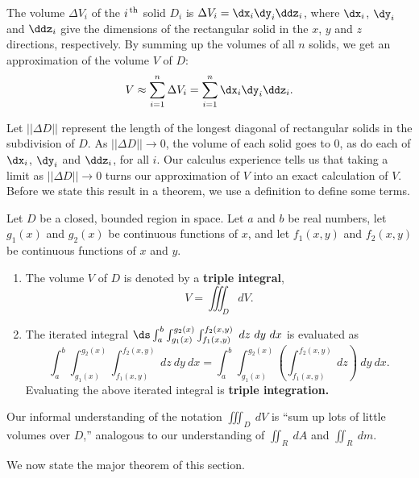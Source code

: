 The volume $\Delta V_i$ of the $i^\text{\,th}$ solid $D_i$ is $\Delta V_i = \dx_i\dy_i\ddz_i$, where $\dx_i$, $\dy_i$ and $\ddz_i$ give the dimensions of the rectangular solid in the $x$, $y$ and $z$ directions, respectively. By summing up the volumes of all $n$ solids, we get an approximation of the volume $V$ of $D$:
$$V \approx \sum_{i=1}^n \Delta V_i = \sum_{i=1}^n \dx_i\dy_i\ddz_i.$$

Let $||\Delta D||$ represent the length of the longest diagonal of rectangular solids in the subdivision of $D$. As $||\Delta D||\to 0$, the volume of each solid goes to 0, as do each of $\dx_i$, $\dy_i$ and $\ddz_i$, for all $i$. Our calculus experience tells us that taking a limit as $||\Delta D||\to 0$ turns our approximation of $V$ into an exact calculation of $V$. Before we state this result in a theorem, we use a definition to define some terms.
\clearpage

\setboxwidth{100pt}
\enlargethispage{3\baselineskip}
\noindent\hskip-100pt\begin{minipage}{\linewidth}
{Let $D$ be a closed, bounded region in space. Let $a$ and $b$ be real numbers, let $g_1(x)$ and $g_2(x)$ be continuous functions of $x$, and let $f_1(x,y)$ and $f_2(x,y)$ be continuous functions of $x$ and $y$.
\begin{enumerate}
	\item	The volume $V$ of $D$ is denoted by a \textbf{triple integral},
	$$V = \iiint_D dV.$$
	
	\item The iterated integral $\ds \int_a^b\int_{g_1(x)}^{g_2(x)}\int_{f_1(x,y)}^{f_2(x,y)} \ dz\ dy\ dx$ is evaluated as 
	$$\int_a^b\int_{g_1(x)}^{g_2(x)}\int_{f_1(x,y)}^{f_2(x,y)} \ dz\ dy\ dx=\int_a^b\int_{g_1(x)}^{g_2(x)}\left(\int_{f_1(x,y)}^{f_2(x,y)} \ dz\right)\ dy\ dx.$$
	Evaluating the above iterated integral is \textbf{triple integration.}
	
	
\end{enumerate}
}
\end{minipage}
\vskip-5pt

Our informal understanding of the notation $\iiint_D\ dV$ is ``sum up lots of little volumes over $D$,'' analogous to our understanding of $\iint_R\ dA$ and $\iint_R\ dm$.

We now state the major theorem of this section.\vskip-5pt

